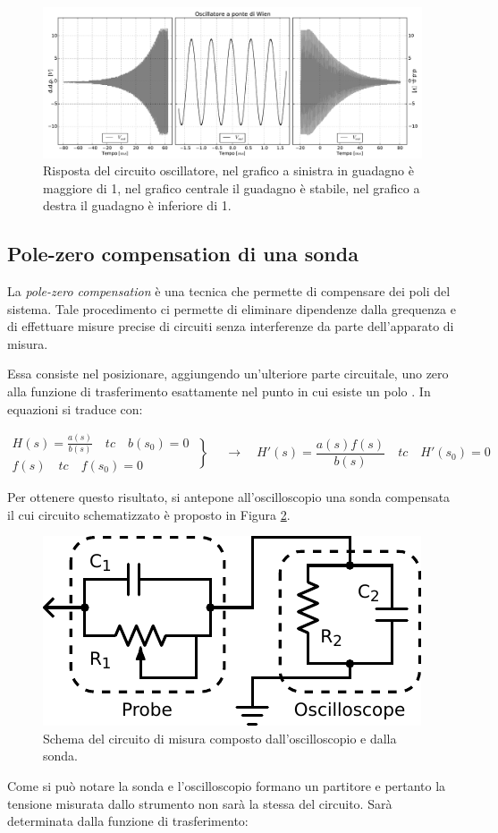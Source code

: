 \begin{figure}[htpc]
\centering
\includegraphics[width=.95\textwidth]{../E08/latex/grey_wien.pdf}
\caption{Risposta del circuito oscillatore, nel grafico a sinistra in guadagno è maggiore di \num{1}, nel grafico centrale il guadagno è stabile, nel grafico a destra il guadagno è inferiore di \num{1}.}
\label{fig8:wien}
\end{figure}

\subsection{Pole-zero compensation di una sonda}

La \textit{pole-zero compensation} è una tecnica che permette di compensare dei poli del sistema. Tale procedimento ci permette di eliminare dipendenze dalla grequenza e di effettuare misure precise di circuiti senza interferenze da parte dell'apparato di misura.

Essa consiste nel posizionare, aggiungendo un'ulteriore parte circuitale, uno zero alla funzione di trasferimento esattamente nel punto in cui esiste un polo .
In equazioni si traduce con:

\[
  \begin{array}{lr}
H(s) = \frac{a(s)}{b(s)} \quad tc \quad b(s_0) = 0 \\
f(s) \quad tc \quad f(s_0) = 0
  \end{array}\left\}
\quad \longrightarrow \quad H'(s) = \frac{a(s)f(s)}{b(s)} \quad tc \quad H'(s_0) = 0
\right.
\]

Per ottenere questo risultato, si antepone all'oscilloscopio una sonda compensata il cui circuito schematizzato è proposto in Figura \ref{cir8:probe}.

\begin{figure}
\centering
\includegraphics[width=.35\textwidth]{../E08/latex/probe.pdf}
\caption{Schema del circuito di misura composto dall'oscilloscopio e dalla sonda.}
\label{cir8:probe}
\end{figure}
Come si può notare la sonda e l'oscilloscopio formano un partitore e pertanto la tensione misurata dallo strumento non sarà la stessa del circuito.
Sarà determinata dalla funzione di trasferimento:

